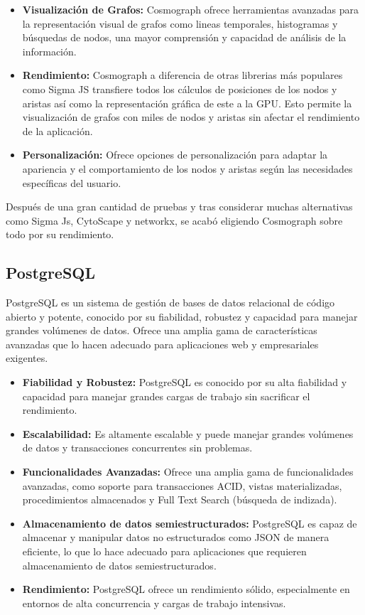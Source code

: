 \begin{itemize}
	\item \textbf{Visualización de Grafos:} Cosmograph ofrece herramientas avanzadas para la representación visual de grafos como lineas temporales, histogramas y búsquedas de nodos, una mayor comprensión y capacidad de análisis de la información.

	\item \textbf{Rendimiento:} Cosmograph a diferencia de otras librerias más populares como Sigma JS transfiere todos los cálculos de posiciones de los nodos y aristas así como la representación gráfica de este a la GPU. Esto permite la visualización de grafos con miles de nodos y aristas sin afectar el rendimiento de la aplicación.

	\item \textbf{Personalización:} Ofrece opciones de personalización para adaptar la apariencia y el comportamiento de los nodos y aristas según las necesidades específicas del usuario.

\end{itemize}

Después de una gran cantidad de pruebas y tras considerar muchas alternativas como Sigma Js, CytoScape y networkx, se acabó eligiendo Cosmograph sobre todo por su rendimiento.

\subsection{PostgreSQL}

PostgreSQL es un sistema de gestión de bases de datos relacional de código abierto y potente, conocido por su fiabilidad, robustez y capacidad para manejar grandes volúmenes de datos. Ofrece una amplia gama de características avanzadas que lo hacen adecuado para aplicaciones web y empresariales exigentes.

\begin{itemize}
	\item \textbf{Fiabilidad y Robustez:} PostgreSQL es conocido por su alta fiabilidad y capacidad para manejar grandes cargas de trabajo sin sacrificar el rendimiento.
	\item \textbf{Escalabilidad:} Es altamente escalable y puede manejar grandes volúmenes de datos y transacciones concurrentes sin problemas.
	\item \textbf{Funcionalidades Avanzadas:} Ofrece una amplia gama de funcionalidades avanzadas, como soporte para transacciones ACID, vistas materializadas, procedimientos almacenados y Full Text Search (búsqueda de indizada).
	\item \textbf{Almacenamiento de datos semiestructurados:} PostgreSQL es capaz de almacenar y manipular datos no estructurados como JSON de manera eficiente, lo que lo hace adecuado para aplicaciones que requieren almacenamiento de datos semiestructurados.
	\item \textbf{Rendimiento:} PostgreSQL ofrece un rendimiento sólido, especialmente en entornos de alta concurrencia y cargas de trabajo intensivas.
\end{itemize}

